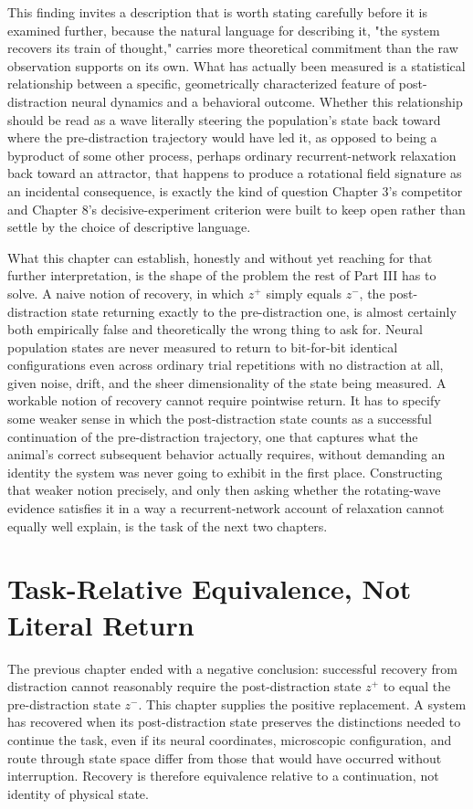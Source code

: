 \documentclass[11pt]{book}
\begin{document}
This finding invites a description that is worth stating carefully before it is examined further, because the natural language for describing it, "the system recovers its train of thought," carries more theoretical commitment than the raw observation supports on its own. What has actually been measured is a statistical relationship between a specific, geometrically characterized feature of post-distraction neural dynamics and a behavioral outcome. Whether this relationship should be read as a wave literally steering the population's state back toward where the pre-distraction trajectory would have led it, as opposed to being a byproduct of some other process, perhaps ordinary recurrent-network relaxation back toward an attractor, that happens to produce a rotational field signature as an incidental consequence, is exactly the kind of question Chapter 3's competitor and Chapter 8's decisive-experiment criterion were built to keep open rather than settle by the choice of descriptive language.

What this chapter can establish, honestly and without yet reaching for that further interpretation, is the shape of the problem the rest of Part III has to solve. A naive notion of recovery, in which $z^{+}$ simply equals $z^{-}$, the post-distraction state returning exactly to the pre-distraction one, is almost certainly both empirically false and theoretically the wrong thing to ask for. Neural population states are never measured to return to bit-for-bit identical configurations even across ordinary trial repetitions with no distraction at all, given noise, drift, and the sheer dimensionality of the state being measured. A workable notion of recovery cannot require pointwise return. It has to specify some weaker sense in which the post-distraction state counts as a successful continuation of the pre-distraction trajectory, one that captures what the animal's correct subsequent behavior actually requires, without demanding an identity the system was never going to exhibit in the first place. Constructing that weaker notion precisely, and only then asking whether the rotating-wave evidence satisfies it in a way a recurrent-network account of relaxation cannot equally well explain, is the task of the next two chapters.

\chapter{Task-Relative Equivalence, Not Literal Return}

The previous chapter ended with a negative conclusion: successful recovery from distraction cannot reasonably require the post-distraction state $z^{+}$ to equal the pre-distraction state $z^{-}$. This chapter supplies the positive replacement. A system has recovered when its post-distraction state preserves the distinctions needed to continue the task, even if its neural coordinates, microscopic configuration, and route through state space differ from those that would have occurred without interruption. Recovery is therefore equivalence relative to a continuation, not identity of physical state.
\end{document}
